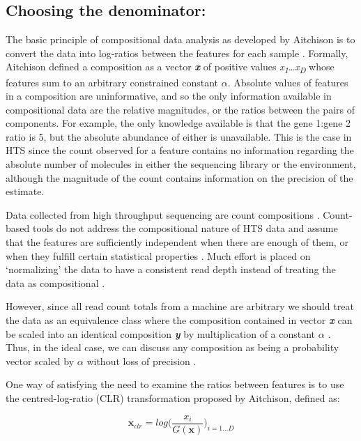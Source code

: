 \documentclass{bmcart}
\begin{document}
\subsection*{Choosing the denominator:}

The basic principle of compositional data analysis as developed by Aitchison is to convert the data into log-ratios between the features for each sample \cite{Aitchison:1986}. Formally, Aitchison defined a composition as a vector \textit{\textbf{x}}  of positive values \textit{x\textsubscript{1}}\ldots\textit{x\textsubscript{D}} whose features  sum to an arbitrary constrained constant $\alpha$. Absolute values of features in a composition are uninformative, and so the only information available in compositional data are the relative magnitudes, or the ratios between the pairs of components. For example, the only knowledge available is that the gene 1:gene 2 ratio is 5, but the absolute abundance of either is unavailable. This is the case in HTS since the count observed for a feature contains no information regarding the absolute number of molecules in either the sequencing library or the environment, although the magnitude of the count contains information on the precision of the estimate.

Data collected from high throughput sequencing are count compositions \cite{fernandes:2014,gloorAJS:2016}. Count-based tools do not address the compositional nature of HTS data \cite{gloorAJS:2016,fernandes:2014} and assume that the features are sufficiently independent when there are enough of them, or when they fulfill certain statistical properties \cite{Weiss:2016aa}. Much effort is placed on `normalizing' the data to have a consistent read depth instead of treating the data as compositional \cite{Sun:2013aa,McMurdie:2014a}.

However, since all read count totals from a machine are arbitrary we should treat the data as an equivalence class  where the composition contained in vector \textit{\bf{x}} can be scaled into an identical composition \textit{\textbf{y}} by multiplication of a constant $\alpha$ \cite{barcelo:2001}. Thus, in the ideal case, we can discuss any composition as being a probability vector scaled by $\alpha$ without loss of precision \cite{fernandes:2013}. 

One way of satisfying the need to examine the ratios between features is to use the centred-log-ratio (CLR) transformation proposed by Aitchison, defined as: 

\begin{equation}
\textbf{x}_{clr} = log  \big( \frac{x_i}{G(\textbf{x})}   \big)_{i=1\dots D}
\label{eq:CLR}
\end{equation}
\end{document}
